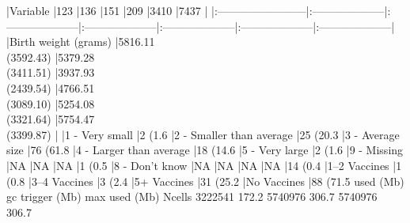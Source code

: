 |Variable                 |123                  |136                  |151                  |209                  |3410                 |7437                 |
|:------------------------|:--------------------|:--------------------|:--------------------|:--------------------|:--------------------|:--------------------|
|Birth weight (grams)     |5816.11 \\ (3592.43) |5379.28 \\ (3411.51) |3937.93 \\ (2439.54) |4766.51 \\ (3089.10) |5254.08 \\ (3321.64) |5754.47 \\ (3399.87) |
|1 - Very small           |2 (1.6%
|2 - Smaller than average |25 (20.3%
|3 - Average size         |76 (61.8%
|4 - Larger than average  |18 (14.6%
|5 - Very large           |2 (1.6%
|9 - Missing              |NA                   |NA                   |NA                   |1 (0.5%
|8 - Don’t know           |NA                   |NA                   |NA                   |NA                   |14 (0.4%
|1–2 Vaccines             |1 (0.8%
|3–4 Vaccines             |3 (2.4%
|5+ Vaccines              |31 (25.2%
|No Vaccines              |88 (71.5%
           used  (Mb) gc trigger    (Mb)   max used    (Mb)
Ncells  3222541 172.2    5740976   306.7    5740976   306.7
